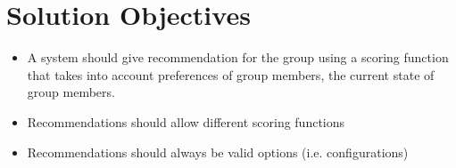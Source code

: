 \section{Solution Objectives}

\begin{itemize}
    \item A system should give recommendation for the group using a scoring function that takes into account preferences of group members, the current state of group members.
    \item Recommendations should allow different scoring functions
    \item Recommendations should always be valid options (i.e. configurations)
\end{itemize}